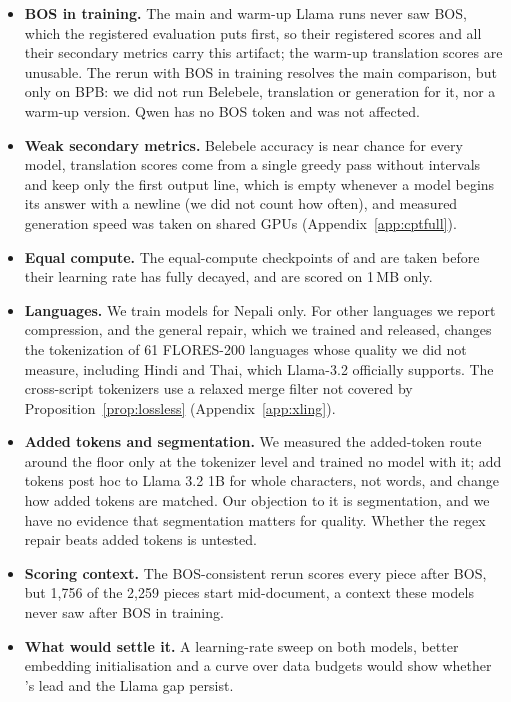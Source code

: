 \begin{itemize}
  \item \textbf{BOS in training.} The main and warm-up Llama runs never saw BOS, which the registered evaluation puts first, so their registered scores and all their secondary metrics carry this artifact; the warm-up translation scores are unusable. The rerun with BOS in training resolves the main comparison, but only on BPB: we did not run Belebele, translation or generation for it, nor a warm-up version. Qwen has no BOS token and was not affected.
  \item \textbf{Weak secondary metrics.} Belebele accuracy is near chance for every model, translation scores come from a single greedy pass without intervals and keep only the first output line, which is empty whenever a model begins its answer with a newline (we did not count how often), and measured generation speed was taken on shared GPUs (Appendix~\ref{app:cptfull}).
  \item \textbf{Equal compute.} The equal-compute checkpoints of \RO{} and \RI{} are taken before their learning rate has fully decayed, and are scored on 1\,MB only.
  \item \textbf{Languages.} We train models for Nepali only. For other languages we report compression, and the general repair, which we trained and released, changes the tokenization of 61 FLORES-200 languages whose quality we did not measure, including Hindi and Thai, which Llama-3.2 officially supports. The cross-script tokenizers use a relaxed merge filter not covered by Proposition~\ref{prop:lossless} (Appendix~\ref{app:xling}).
  \item \textbf{Added tokens and segmentation.} We measured the added-token route around the floor only at the tokenizer level and trained no model with it; \citet{churchill2026reducing} add tokens post hoc to Llama 3.2 1B for whole characters, not words, and \citet{balde-etal-2024-adaptive} change how added tokens are matched. Our objection to it is segmentation, and we have no evidence that segmentation matters for quality. Whether the regex repair beats added tokens is untested.
  \item \textbf{Scoring context.} The BOS-consistent rerun scores every piece after BOS, but 1{,}756 of the 2{,}259 pieces start mid-document, a context these models never saw after BOS in training.
  \item \textbf{What would settle it.} A learning-rate sweep on both models, better embedding initialisation and a curve over data budgets would show whether \RO{}'s lead and the Llama gap persist.
\end{itemize}

